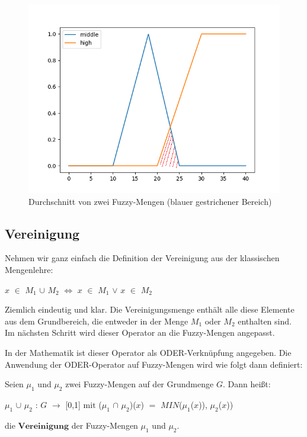 \begin{figure}[htbp]
	\centering
	\includegraphics[scale=0.5]{images/und_high_middle_temp.png}
	\caption{Durchschnitt von zwei Fuzzy-Mengen (blauer gestrichener Bereich)}\label{high_low_temp_intersection}
\end{figure}



\subsection{Vereinigung}

Nehmen wir ganz einfach die Definition der Vereinigung aus der klassischen Mengenlehre:
	\begin{center}
	$x$  $\in$ $M_1$ $\cup$ $M_2$ $\Leftrightarrow$ $x$ $\in$ $M_1$ $\vee$ $x$ $\in$ $M_2$
	\end{center}

Ziemlich eindeutig und klar. Die Vereinigungsmenge enthält alle diese Elemente aus dem Grundbereich, die entweder in der Menge $M_1$ oder $M_2$ enthalten sind. Im nächsten Schritt wird dieser Operator an die Fuzzy-Mengen angepasst.

In der Mathematik ist dieser Operator als ODER-Verknüpfung angegeben. Die Anwendung der ODER-Operator auf Fuzzy-Mengen wird wie folgt dann definiert:


\begin{definition}
	Seien $\mu_1$ und $\mu_2$ zwei Fuzzy-Mengen auf der Grundmenge $G$. Dann heißt:
	\begin{center}
		$\mu_1$ $\cup$ $\mu_2$ : $G$ $\rightarrow$ [0,1] $\text{mit}$  ($\mu_1$ $\cap$ $\mu_2$)($x$) $=$ $MIN$($\mu_1$($x$)), $\mu_2$($x$)) 
	\end{center}
	die $\textbf{Vereinigung}$ der Fuzzy-Mengen $\mu_1$ und $\mu_2$.
\end{definition}

